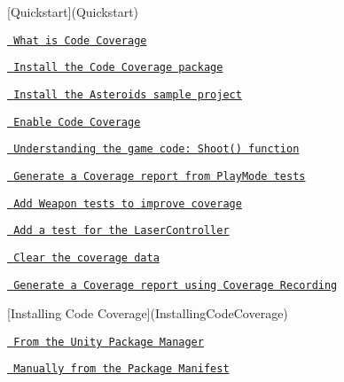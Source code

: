\mbox{[}Quickstart\mbox{]}(Quickstart)
\begin{DoxyItemize}
\item \href{Quickstart\#1-what-is-code-coverage-sub2-minsub}{\texttt{ What is Code Coverage}}
\item \href{Quickstart\#2-install-the-code-coverage-package-sub2-minsub}{\texttt{ Install the Code Coverage package}}
\item \href{Quickstart\#3-install-the-asteroids-sample-project-sub1-minsub}{\texttt{ Install the Asteroids sample project}}
\item \href{Quickstart\#4-enable-code-coverage-sub1-minsub}{\texttt{ Enable Code Coverage}}
\item \href{Quickstart.html\#5-understanding-the-game-code-shoot-function-sub4-minsub}{\texttt{ Understanding the game code\+: Shoot() function}}
\item \href{Quickstart\#6-generate-a-coverage-report-from-playmode-tests-sub3-minsub}{\texttt{ Generate a Coverage report from Play\+Mode tests}}
\item \href{Quickstart\#7-add-weapon-tests-to-improve-coverage-sub3-minsub}{\texttt{ Add Weapon tests to improve coverage}}
\item \href{Quickstart\#8-add-a-test-for-the-lasercontroller-sub4-minsub}{\texttt{ Add a test for the Laser\+Controller}}
\item \href{Quickstart\#9-clear-the-coverage-data-sub1-minsub}{\texttt{ Clear the coverage data}}
\item \href{Quickstart\#10-generate-a-coverage-report-using-coverage-recording-sub4-minsub}{\texttt{ Generate a Coverage report using Coverage Recording}}
\end{DoxyItemize}

\mbox{[}Installing Code Coverage\mbox{]}(Installing\+Code\+Coverage)
\begin{DoxyItemize}
\item \href{InstallingCodeCoverage\#from-the-unity-package-manager}{\texttt{ From the Unity Package Manager}}
\item \href{InstallingCodeCoverage\#manually-from-the-package-manifest}{\texttt{ Manually from the Package Manifest}}
\end{DoxyItemize}

